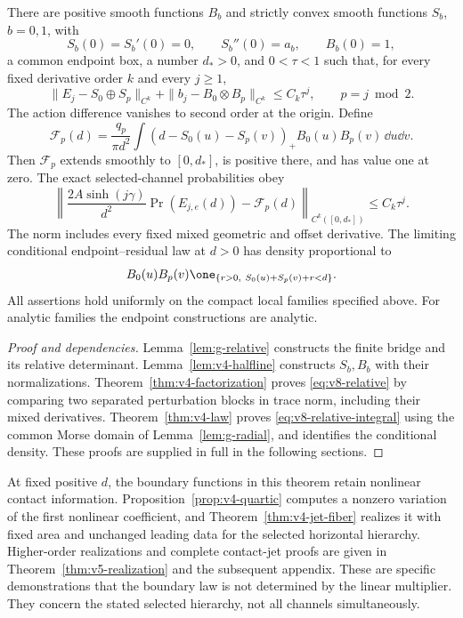 \begin{theorem}\label{thm:v8-main-relative}
There are positive smooth functions $B_b$ and strictly convex smooth
functions $S_b$, $b=0,1$, with
\[
 S_b(0)=S_b'(0)=0,\qquad S_b''(0)=a_b,\qquad B_b(0)=1,
\]
a common endpoint box, a number $d_*>0$, and $0<\tau<1$ such that,
for every fixed derivative order $k$ and every $j\ge1$,
\begin{equation}\label{eq:v8-relative}
 \|E_j-S_0\oplus S_p\|_{C^k}
 +\|b_j-B_0\otimes B_p\|_{C^k}\le C_k\tau^j,
                    \qquad p=j\bmod2.
\end{equation}
The action difference vanishes to second order at the origin. Define
\begin{equation}\label{eq:v8-boundary-integral}
 \mathcal F_p(d)=\frac{q_p}{\pi d^2}
  \int(d-S_0(u)-S_p(v))_+B_0(u)B_p(v)\,\dd u\dd v.
\end{equation}
Then $\mathcal F_p$ extends smoothly to $[0,d_*]$, is positive there,
and has value one at zero. The exact selected-channel probabilities obey
\begin{equation}\label{eq:v8-relative-integral}
 \left\|\frac{2A\sinh(j\gamma)}{d^2}
           \Pr(E_{j,e}(d))-\mathcal F_p(d)\right\|_{C^k([0,d_*])}
                                  \le C_k\tau^j.
\end{equation}
The norm includes every fixed mixed geometric and offset derivative.
The limiting conditional endpoint--residual law at $d>0$ has density
proportional to
\[
 B_0(u)B_p(v)\one_{\{r>0,\ S_0(u)+S_p(v)+r<d\}}.
\]
All assertions hold uniformly on the compact local families specified
above. For analytic families the endpoint constructions are analytic.
\end{theorem}

\begin{proof}[Proof and dependencies]
Lemma~\ref{lem:g-relative} constructs the finite bridge and its relative
determinant. Lemma~\ref{lem:v4-halfline} constructs $S_b,B_b$ with their
normalizations. Theorem~\ref{thm:v4-factorization} proves
\eqref{eq:v8-relative} by comparing two separated perturbation blocks in
trace norm, including their mixed derivatives. Theorem~\ref{thm:v4-law}
proves \eqref{eq:v8-relative-integral} using the common Morse domain of
Lemma~\ref{lem:g-radial}, and identifies the conditional density.
These proofs are supplied in full in the following sections.
\end{proof}

At fixed positive $d$, the boundary functions in this theorem retain
nonlinear contact information. Proposition~\ref{prop:v4-quartic} computes
a nonzero variation of the first nonlinear coefficient, and
Theorem~\ref{thm:v4-jet-fiber} realizes it with fixed area and unchanged
leading data for the selected horizontal hierarchy. Higher-order
realizations and complete contact-jet proofs are given in
Theorem~\ref{thm:v5-realization} and the subsequent appendix. These are
specific demonstrations that the boundary law is not determined by the
linear multiplier. They concern the stated selected hierarchy, not all
channels simultaneously.

